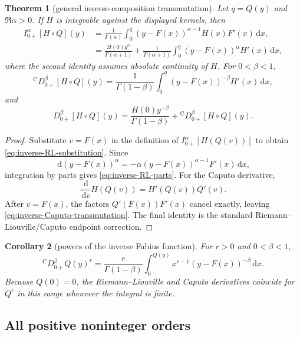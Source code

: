 \documentclass[11pt,oneside]{article}
\numberwithin{equation}{section}
\theoremstyle{plain}
\newtheorem{theorem}{Theorem}[section]
\newtheorem{corollary}[theorem]{Corollary}
\theoremstyle{definition}
\theoremstyle{remark}
\newcommand{\dd}{\,\mathrm d}
\newcommand{\Ccap}{\mathrm C}
\begin{document}
\begin{theorem}[general inverse-composition transmutation]
\label{thm:left-transmutation}
Let $q=Q(y)$ and $\Re\alpha>0$.  If $H$ is integrable against the displayed
kernels, then
\begin{align}
 I_{0+}^\alpha[H\circ Q](y)
 &=\frac1{\Gamma(\alpha)}
   \int_0^q(y-F(x))^{\alpha-1}H(x)F'(x)\dd x,
 \label{eq:inverse-RL-substitution}\\
 &=\frac{H(0)y^\alpha}{\Gamma(\alpha+1)}
   +\frac1{\Gamma(\alpha+1)}
    \int_0^q(y-F(x))^\alpha H'(x)\dd x,
 \label{eq:inverse-RL-parts}
\end{align}
where the second identity assumes absolute continuity of $H$.
For $0<\beta<1$,
\begin{equation}
 {}^{\Ccap}D_{0+}^\beta[H\circ Q](y)
 =\frac1{\Gamma(1-\beta)}
  \int_0^q(y-F(x))^{-\beta}H'(x)\dd x,
 \label{eq:inverse-Caputo-transmutation}
\end{equation}
and
\begin{equation}
 D_{0+}^\beta[H\circ Q](y)
 =\frac{H(0)y^{-\beta}}{\Gamma(1-\beta)}
  +{}^{\Ccap}D_{0+}^\beta[H\circ Q](y).
 \label{eq:inverse-RL-vs-Caputo}
\end{equation}
\end{theorem}

\begin{proof}
Substitute $v=F(x)$ in the definition of $I_{0+}^\alpha[H(Q(v))]$ to obtain
\cref{eq:inverse-RL-substitution}.  Since
\[
 \dd (y-F(x))^\alpha
 =-\alpha(y-F(x))^{\alpha-1}F'(x)\dd x,
\]
integration by parts gives \cref{eq:inverse-RL-parts}.
For the Caputo derivative,
\[
 \frac{\dd}{\dd v}H(Q(v))=H'(Q(v))Q'(v).
\]
After $v=F(x)$, the factors $Q'(F(x))F'(x)$ cancel exactly, leaving
\cref{eq:inverse-Caputo-transmutation}.  The final identity is the standard
Riemann--Liouville/Caputo endpoint correction.
\end{proof}

\begin{corollary}[powers of the inverse Fabius function]
For $r>0$ and $0<\beta<1$,
\begin{equation}
 {}^{\Ccap}D_{0+}^\beta Q(y)^r
 =\frac{r}{\Gamma(1-\beta)}
   \int_0^{Q(y)}x^{r-1}(y-F(x))^{-\beta}\dd x.
 \label{eq:Caputo-Q-power}
\end{equation}
Because $Q(0)=0$, the Riemann--Liouville and Caputo derivatives coincide for
$Q^r$ in this range whenever the integral is finite.
\end{corollary}

\subsection{All positive noninteger orders}
\end{document}

